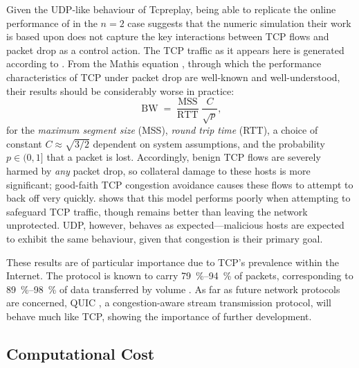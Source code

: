 \documentclass[conference, letterpaper, 10pt, times]{IEEEtran}
\begin{document}
Given the UDP-like behaviour of Tcpreplay, being able to replicate the online performance of \citeauthor{DBLP:journals/eaai/MalialisK15} in the $n=2$ case suggests that the numeric simulation their work is based upon does not capture the key interactions between TCP flows and packet drop as a control action.
The TCP traffic as it appears here is generated according to .
From the Mathis equation \cite{DBLP:journals/ccr/MathisSMO97}, through which the performance characteristics of TCP under packet drop are well-known and well-understood, their results should be considerably worse in practice:
\begin{equation}
\operatorname{BW} = \frac{\operatorname{MSS}}{\operatorname{RTT}} \frac{C}{\sqrt{p}},
\end{equation}
for the \emph{maximum segment size} (MSS), \emph{round trip time} (RTT), a choice of constant $C \approx{} \sqrt{3/2}$ dependent on system assumptions, and the probability $p \in (0, 1]$ that a packet is lost.
Accordingly, benign TCP flows are severely harmed by \emph{any} packet drop, so collateral damage to these hosts is more significant; good-faith TCP congestion avoidance causes these flows to attempt to back off very quickly.
 shows that this model performs poorly when attempting to safeguard TCP traffic, though remains better than leaving the network unprotected.
UDP, however, behaves as expected---malicious hosts are expected to exhibit the same behaviour, given that congestion is their primary goal.

These results are of particular importance due to TCP's prevalence within the Internet.
The protocol is known to carry \SIrange{79}{94}{\percent} of packets, corresponding to \SIrange{89}{98}{\percent} of data transferred by volume \cite{DBLP:conf/saint/ZhangDJC09}.
As far as future network protocols are concerned, QUIC \cite{DBLP:conf/sigcomm/LangleyRWVKZYKS17}, a congestion-aware stream transmission protocol, will behave much like TCP, showing the importance of further development.

\subsection{Computational Cost}
\end{document}
